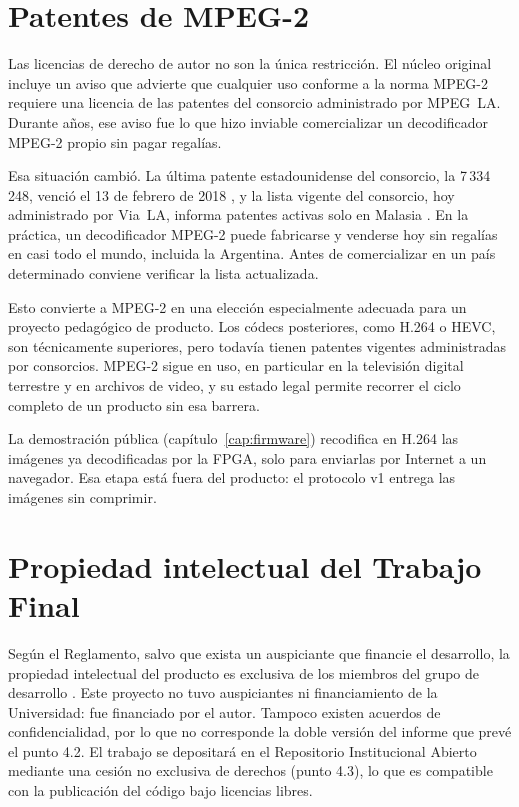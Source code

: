 \section{Patentes de MPEG-2}
\label{sec:patentes}

Las licencias de derecho de autor no son la única restricción. El núcleo
original incluye un aviso que advierte que cualquier uso conforme a la norma
MPEG-2 requiere una licencia de las patentes del consorcio administrado por
MPEG~LA. Durante años, ese aviso fue lo que hizo inviable comercializar un
decodificador MPEG-2 propio sin pagar regalías.

Esa situación cambió. La última patente estadounidense del consorcio, la
7\,334\,248, venció el 13 de febrero de 2018 \citep{TechRepublic_2018}, y la
lista vigente del consorcio, hoy administrado por Via~LA, informa patentes
activas solo en Malasia \citep{ViaLA_mpeg2_patentes}. En la práctica, un
decodificador MPEG-2 puede fabricarse y venderse hoy sin regalías en casi
todo el mundo, incluida la Argentina. Antes de comercializar en un país
determinado conviene verificar la lista actualizada.

Esto convierte a MPEG-2 en una elección especialmente adecuada para un
proyecto pedagógico de producto. Los códecs posteriores, como H.264 o HEVC,
son técnicamente superiores, pero todavía tienen patentes vigentes
administradas por consorcios. MPEG-2 sigue en uso, en particular en la
televisión digital terrestre y en archivos de video, y su estado legal
permite recorrer el ciclo completo de un producto sin esa barrera.

\begin{nota}
La demostración pública (capítulo~\ref{cap:firmware}) recodifica en H.264 las
imágenes ya decodificadas por la FPGA, solo para enviarlas por Internet a un
navegador. Esa etapa está fuera del producto: el protocolo v1 entrega las
imágenes sin comprimir.
\end{nota}

\section{Propiedad intelectual del Trabajo Final}

Según el Reglamento, salvo que exista un auspiciante que financie el
desarrollo, la propiedad intelectual del producto es exclusiva de los
miembros del grupo de desarrollo \citep[punto 4.1]{UTN_FRLR_2023_reglamento}.
Este proyecto no tuvo auspiciantes ni financiamiento de la Universidad: fue
financiado por el autor. Tampoco existen acuerdos de confidencialidad, por lo
que no corresponde la doble versión del informe que prevé el punto 4.2. El
trabajo se depositará en el Repositorio Institucional Abierto mediante una
cesión no exclusiva de derechos (punto 4.3), lo que es compatible con la
publicación del código bajo licencias libres.

